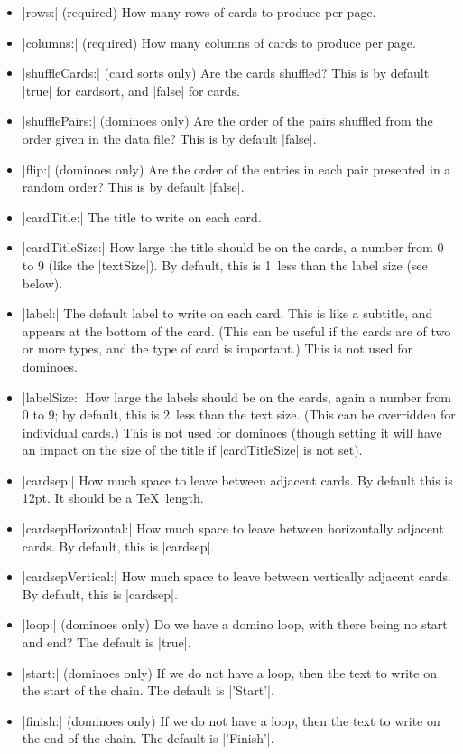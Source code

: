 \documentclass{article}
\begin{document}
\begin{itemize}
\item |rows:| (required) How many rows of cards to produce per
  page.
\item |columns:| (required) How many columns of cards to produce
  per page.
\item |shuffleCards:| (card sorts only) Are the cards shuffled?
  This is by default |true| for cardsort, and |false| for
  cards.
\item |shufflePairs:| (dominoes only) Are the order of the pairs
  shuffled from the order given in the data file?  This is by default
  |false|.
\item |flip:| (dominoes only) Are the order of the entries in
  each pair presented in a random order?  This is by default
  |false|.
\item |cardTitle:| The title to write on each card.
\item |cardTitleSize:| How large the title should be on the
  cards, a number from 0 to 9 (like the |textSize|).  By default,
  this is 1~less than the label size (see below).
\item |label:| The default label to write on each card.  This is
  like a subtitle, and appears at the bottom of the card.  (This can
  be useful if the cards are of two or more types, and the type of
  card is important.)  This is not used for dominoes.
\item |labelSize:| How large the labels should be on the cards,
  again a number from 0 to 9; by default, this is 2~less than the text
  size.  (This can be overridden for individual cards.)  This is not
  used for dominoes (though setting it will have an impact on the size
  of the title if |cardTitleSize| is not set).
\item |cardsep:| How much space to leave between
  adjacent cards.  By default this is 12pt.  It should be a \TeX\
  length.
\item |cardsepHorizontal:| How much space to leave between
  horizontally adjacent cards.  By default, this is |cardsep|.
\item |cardsepVertical:| How much space to leave between
  vertically adjacent cards.  By default, this is |cardsep|.
\item |loop:| (dominoes only) Do we have a domino loop, with
  there being no start and end?  The default is |true|.
\item |start:| (dominoes only) If we do not have a loop, then the
  text to write on the start of the chain.  The default is |'Start'|.
\item |finish:| (dominoes only) If we do not have a loop, then the
  text to write on the end of the chain.  The default is |'Finish'|.
\end{itemize}
\end{document}
